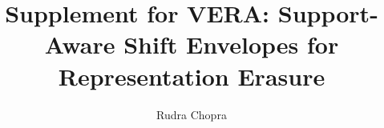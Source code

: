 \documentclass[letterpaper]{article}
\title{Supplement for VERA: Support-Aware Shift Envelopes for Representation Erasure}
\author{Rudra Chopra}
\begin{document}
\maketitle

\nocite{*}

\end{document}
